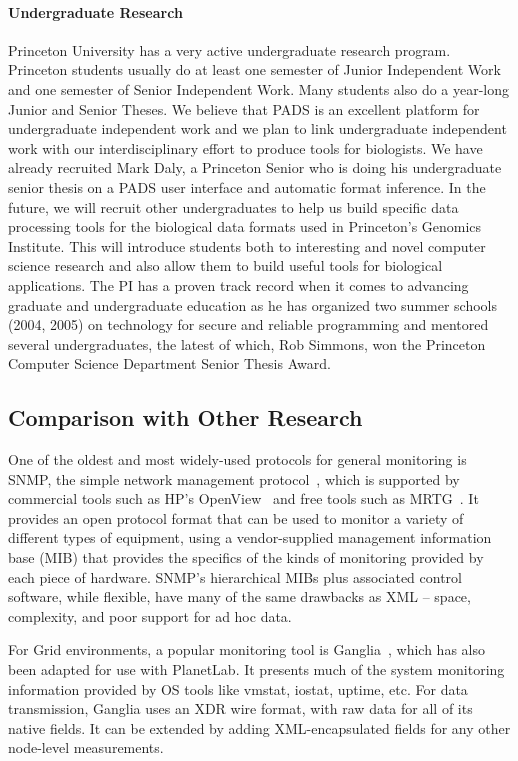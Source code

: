 \documentclass[10pt]{article}
\begin{document}
\paragraph*{Undergraduate Research}
Princeton University has a very active undergraduate research program.
Princeton students usually do at least one semester of
Junior Independent Work and one semester of Senior Independent Work. 
Many students also do a year-long
Junior and Senior Theses.  We believe that PADS is an excellent
platform for undergraduate independent work and we plan to link
undergraduate independent work with our interdisciplinary effort to
produce tools for biologists.  We have already recruited Mark Daly,
a Princeton Senior who is doing his undergraduate senior thesis
on a PADS user interface and automatic format inference.
In the future, we will recruit other undergraduates to help us build
specific data processing tools for the biological data formats
used in Princeton's Genomics Institute.
This will introduce students both to interesting and novel
computer science research and also allow them to build useful
tools for biological applications. The PI has a proven track record
when it comes to advancing graduate and undergraduate education
as he has organized two summer schools (2004, 2005) on technology for
secure and reliable programming and mentored several undergraduates,
the latest of which, Rob Simmons, won the Princeton Computer Science Department
Senior Thesis Award.

\subsection{Comparison with Other Research}
\label{ssec:related}

One of the oldest and most widely-used protocols for general monitoring
is SNMP, the simple network management protocol~\cite{snmprfc1157},
which is supported by commercial tools such as HP's
OpenView~\cite{openview} and free tools such as MRTG~\cite{mrtg}. It
provides an open protocol format that can be used to monitor a variety
of different types of equipment, using a vendor-supplied management
information base (MIB) that provides the specifics of the kinds of
monitoring provided by each piece of hardware. SNMP's hierarchical
MIBs plus associated control software, while flexible, have many of
the same drawbacks as XML -- space, complexity, and poor support for
ad hoc data.

For Grid environments, a popular monitoring tool is
Ganglia~\cite{ganglia}, which has also been adapted for use with
PlanetLab. It presents much of the system monitoring information
provided by OS tools like vmstat, iostat, uptime, etc. For data
transmission, Ganglia uses an XDR wire format, with raw data for all
of its native fields.  It can be extended by adding XML-encapsulated
fields for any other node-level measurements. 
\end{document}

